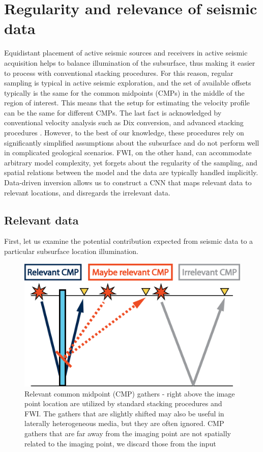 \documentclass[paper,twocolomn]{geophysics}
\begin{document}
\section{Regularity and relevance of seismic data}
Equidistant placement of active seismic sources and receivers in active seismic acquisition helps to balance illumination of the subsurface, thus making it easier to process with conventional stacking procedures. For this reason, regular sampling is typical in active seismic exploration, and the set of available offsets typically is the same for the common midpoints (CMPs) in the middle of the region of interest.
This means that the setup for estimating the velocity profile can be the same for different CMPs.
The last fact is acknowledged by conventional velocity analysis such as Dix conversion, and advanced stacking procedures \citep{mann1999common}. However, to the best of our knowledge, these procedures rely on significantly simplified assumptions about the subsurface and do not perform well in complicated geological scenarios.
FWI, on the other hand, can accommodate arbitrary model complexity, yet forgets about the regularity of the sampling, and spatial relations between the model and the data are typically handled implicitly. Data-driven inversion allows us to construct a CNN that maps relevant data to relevant locations, and disregards the irrelevant data.  

\subsection{Relevant data}

First, let us examine the potential contribution expected from seismic data to a particular subsurface location illumination.

\begin{figure}[h!]
	\centering
	\includegraphics[width=0.7\linewidth]{Fig/relevantCMP}
	\caption{Relevant common midpoint (CMP) gathers - right above the image point location are utilized by standard stacking procedures and FWI. The gathers that are slightly shifted may also be useful in laterally heterogeneous media, but they are often ignored. CMP gathers that are far away from the imaging point are not spatially related to the imaging point, we discard those from the input}
	\label{fig:relevantCMP}
\end{figure}
\end{document}
